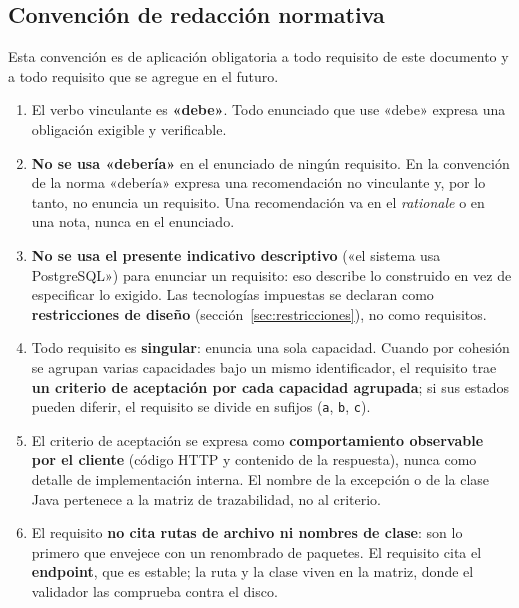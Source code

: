 \documentclass[11pt,a4paper]{article}
\begin{document}
\subsection{Convención de redacción normativa}
\label{sec:convencion}

Esta convención es de aplicación obligatoria a todo requisito de este documento y a todo
requisito que se agregue en el futuro.

\begin{enumerate}
    \item El verbo vinculante es \textbf{«debe»}. Todo enunciado que use «debe» expresa una
          obligación exigible y verificable.
    \item \textbf{No se usa «debería»} en el enunciado de ningún requisito. En la convención de
          la norma «debería» expresa una recomendación no vinculante y, por lo tanto, no enuncia
          un requisito. Una recomendación va en el \emph{rationale} o en una nota, nunca en el
          enunciado.
    \item \textbf{No se usa el presente indicativo descriptivo} («el sistema usa PostgreSQL»)
          para enunciar un requisito: eso describe lo construido en vez de especificar lo
          exigido. Las tecnologías impuestas se declaran como \textbf{restricciones de diseño}
          (sección~\ref{sec:restricciones}), no como requisitos.
    \item Todo requisito es \textbf{singular}: enuncia una sola capacidad. Cuando por cohesión
          se agrupan varias capacidades bajo un mismo identificador, el requisito trae
          \textbf{un criterio de aceptación por cada capacidad agrupada}; si sus estados pueden
          diferir, el requisito se divide en sufijos (\texttt{a}, \texttt{b}, \texttt{c}).
    \item El criterio de aceptación se expresa como \textbf{comportamiento observable por el
          cliente} (código HTTP y contenido de la respuesta), nunca como detalle de
          implementación interna. El nombre de la excepción o de la clase Java pertenece a la
          matriz de trazabilidad, no al criterio.
    \item El requisito \textbf{no cita rutas de archivo ni nombres de clase}: son lo primero que
          envejece con un renombrado de paquetes. El requisito cita el \textbf{endpoint}, que es
          estable; la ruta y la clase viven en la matriz, donde el validador las comprueba
          contra el disco.
\end{enumerate}
\end{document}

